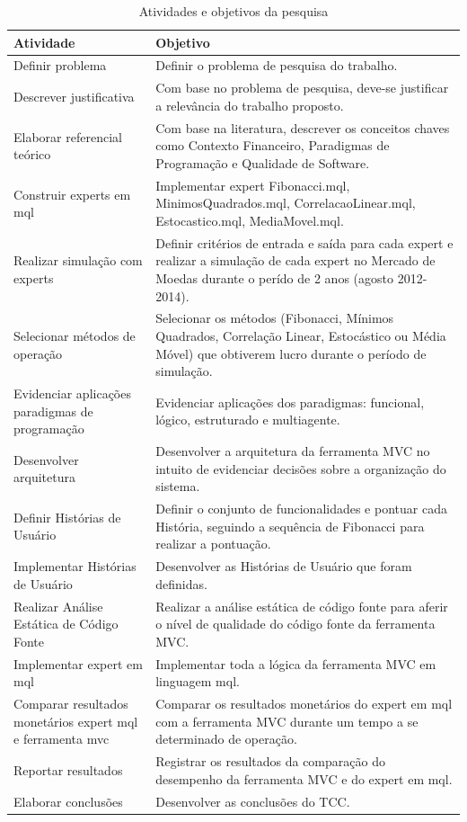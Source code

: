 \begin{table}[H]
\caption{Atividades e objetivos da pesquisa}
\begin{center}
    \begin{tabular}{ |  p{5cm} | p{9cm}|}
    \hline
    \textbf{Atividade} & \textbf{Objetivo} \\ \hline
	Definir problema & Definir o problema de pesquisa do trabalho.\\ \hline
	Descrever justificativa & Com base no problema de pesquisa, deve-se justificar a relevância do trabalho proposto.\\ \hline
	Elaborar referencial teórico & Com base na literatura, descrever os conceitos chaves como Contexto Financeiro, Paradigmas de Programação e Qualidade de Software.\\ \hline
	Construir experts em mql & Implementar expert Fibonacci.mql, MinimosQuadrados.mql, CorrelacaoLinear.mql, Estocastico.mql, MediaMovel.mql. \\ \hline
	Realizar simulação com experts & Definir critérios de entrada e saída para cada expert e realizar a simulação de cada expert no Mercado de Moedas durante o perído de 2 anos (agosto 2012-2014).\\ \hline
	Selecionar métodos de operação & Selecionar os métodos (Fibonacci, Mínimos Quadrados, Correlação Linear, Estocástico ou Média Móvel) que obtiverem lucro durante o período de simulação.\\ \hline
	Evidenciar aplicações paradigmas de programação & Evidenciar aplicações dos paradigmas: funcional, lógico, estruturado e multiagente.\\ \hline
	Desenvolver arquitetura & Desenvolver a arquitetura da ferramenta MVC no intuito de evidenciar decisões sobre a organização do sistema.\\ \hline
	Definir Histórias de Usuário & Definir o conjunto de funcionalidades e pontuar cada História, seguindo a sequência de Fibonacci para realizar a pontuação.\\ \hline
	Implementar Histórias de Usuário & Desenvolver as Histórias de Usuário que foram definidas.\\ \hline
	Realizar Análise Estática de Código Fonte & Realizar a análise estática de código fonte para aferir o nível de qualidade do código fonte da ferramenta MVC.\\ \hline
	Implementar expert em mql & Implementar toda a lógica da ferramenta MVC em linguagem mql.\\ \hline
	Comparar resultados monetários expert mql e ferramenta mvc & Comparar os resultados monetários do expert em mql com a ferramenta MVC durante um tempo a se determinado de operação.\\ \hline
	Reportar resultados & Registrar os resultados da comparação do desempenho da ferramenta MVC e do expert em mql.\\ \hline
	Elaborar conclusões & Desenvolver as conclusões do TCC.\\ \hline
    \end{tabular}
    \end{center}
\label{atividadeMetologia}
\end{table}

